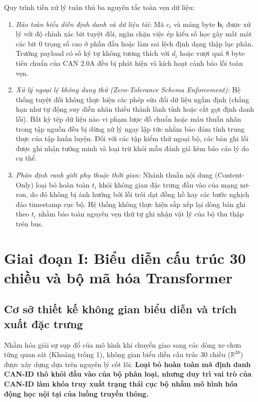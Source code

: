 \documentclass[12pt, a4paper, reqno, oneside]{book}
\begin{document}
Quy trình tiền xử lý tuân thủ ba nguyên tắc toàn vẹn dữ liệu:
\begin{enumerate}
    \item \textit{Bảo toàn biểu diễn định danh và dữ liệu tải:} Mã $c_i$ và mảng byte $\mathbf{b}_i$ được xử lý với độ chính xác bit tuyệt đối, ngăn chặn việc ép kiểu số học gây mất mát các bit 0 trọng số cao ở phần đầu hoặc làm sai lệch định dạng thập lục phân. Trường payload có số ký tự không tương thích với $d_i$ hoặc vượt quá 8 byte tiêu chuẩn của CAN 2.0A đều bị phát hiện và kích hoạt cảnh báo lỗi toàn vẹn.
    \item \textit{Xử lý ngoại lệ không dung thứ (Zero-Tolerance Schema Enforcement):} Hệ thống tuyệt đối không thực hiện các phép sửa đổi dữ liệu ngầm định (chẳng hạn như tự động suy diễn nhãn thiếu thành lành tính hoặc cắt gọt định danh lỗi). Bất kỳ tệp dữ liệu nào vi phạm lược đồ chuẩn hoặc mâu thuẫn nhãn trong tập nguồn đều bị dừng xử lý ngay lập tức nhằm bảo đảm tính trung thực của tập huấn luyện. Đối với các tập kiểm thử ngoại bộ, các bản ghi lỗi được ghi nhận tường minh và loại trừ khỏi mẫu đánh giá kèm báo cáo lý do cụ thể.
    \item \textit{Phân định ranh giới phụ thuộc thời gian:} Nhánh thuần nội dung (Content-Only) loại bỏ hoàn toàn $t_i$ khỏi không gian đặc trưng đầu vào của mạng nơ-ron, do đó không bị ảnh hưởng bởi lỗi trôi dạt đồng hồ hay các bước nghịch đảo timestamp cục bộ. Hệ thống không thực hiện sắp xếp lại dòng bản ghi theo $t_i$ nhằm bảo toàn nguyên vẹn thứ tự ghi nhận vật lý của bộ thu thập trên bus.
\end{enumerate}

\section{Giai đoạn I: Biểu diễn cấu trúc 30 chiều và bộ mã hóa Transformer}\label{sec:structural-rep}

\subsection{Cơ sở thiết kế không gian biểu diễn và trích xuất đặc trưng}
Nhằm hóa giải sự sụp đổ của mô hình khi chuyển giao sang các dòng xe chưa từng quan sát (Khoảng trống 1), không gian biểu diễn cấu trúc 30 chiều ($\mathbb{R}^{30}$) được xây dựng dựa trên nguyên lý cốt lõi: \textbf{Loại bỏ hoàn toàn mã định danh CAN-ID thô khỏi đầu vào của bộ phân loại, nhưng duy trì vai trò của CAN-ID làm khóa truy xuất trạng thái cục bộ nhằm mô hình hóa động học nội tại của luồng truyền thông.}
\end{document}
